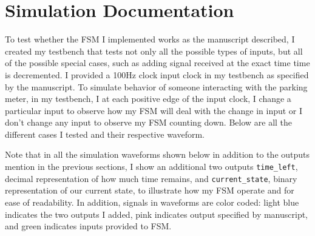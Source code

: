 \documentclass{article}
\begin{document}
\section{Simulation Documentation}
To test whether the FSM I implemented works as the manuscript described, I created my testbench that tests not only all the possible types of inputs, but all of the possible special cases, such as adding signal received at the exact time time is decremented. I provided a 100Hz clock input clock in my testbench as specified by the manuscript.  To simulate behavior of someone interacting with the parking meter, in my testbench, I at each positive edge of the input clock, I change a particular input to observe how my FSM will deal with the change in input or I don't change any input to observe my FSM counting down. Below are all the different cases I tested and their respective waveform. \par
\noindent Note that in all the simulation waveforms shown below in addition to the outputs mention in the previous sections, I show an additional two outputs \texttt{time\_left}, decimal representation of how much time remains, and \texttt{current\_state}, binary representation of our current state, to illustrate how my FSM operate and for ease of readability. In addition, signals in waveforms are color coded: light blue indicates the two outputs I added, pink indicates output specified by manuscript, and green indicates inputs provided to FSM.
\end{document}
